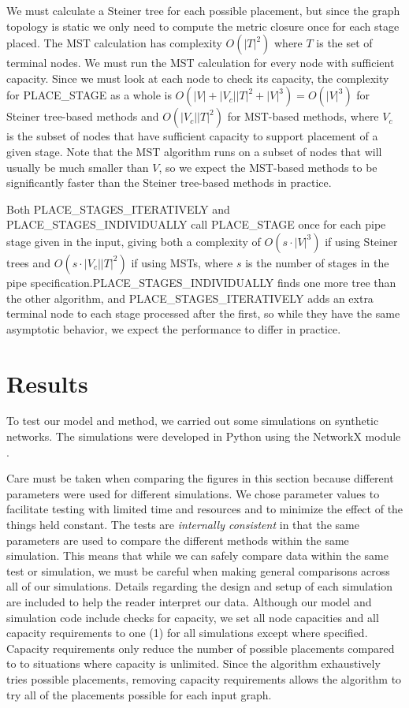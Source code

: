 \documentclass[conference]{IEEEtran}
\begin{document}
	We must calculate a Steiner tree for each possible placement, but since the graph topology is static we only need to compute the metric closure once for each stage placed. The MST calculation has complexity $O(|T|^{2})$ where $T$ is the set of terminal nodes. We must run the MST calculation for every node with sufficient capacity. Since we must look at each node to check its capacity, the complexity for \textsc{PLACE\_STAGE} as a whole is $O(|V| + |V_{c}||T|^{2} + |V|^{3}) = O(|V|^{3})$ for Steiner tree-based methods and $O(|V_{c}||T|^{2})$ for MST-based methods, where $V_{c}$ is the subset of nodes that have sufficient capacity to support placement of a given stage. Note that the MST algorithm runs on a subset of nodes that will usually be much smaller than $V$, so we expect the MST-based methods to be significantly faster than the Steiner tree-based methods in practice.
	
	Both \textsc{PLACE\_STAGES\_ITERATIVELY} and \textsc{PLACE\_STAGES\_INDIVIDUALLY} call \textsc{PLACE\_STAGE} once for each pipe stage given in the input, giving both a complexity of $O(s\cdot |V|^{3})$ if using Steiner trees and $O(s\cdot |V_{c}||T|^{2})$ if using MSTs, where $s$ is the number of stages in the pipe specification.\textsc{PLACE\_STAGES\_INDIVIDUALLY} finds one more tree than the other algorithm, and \textsc{PLACE\_STAGES\_ITERATIVELY} adds an extra terminal node to each stage processed after the first, so while they have the same asymptotic behavior, we expect the performance to differ in practice.
	
	\section{Results}
	To test our model and method, we carried out some simulations on synthetic networks. The simulations were developed in Python using the NetworkX module \cite{Hagberg2008ExploringNS}.
	
	Care must be taken when comparing the figures in this section because different parameters were used for different simulations. We chose parameter values to facilitate testing with limited time and resources and to minimize the effect of the things held constant. The tests are \textit{internally consistent} in that the same parameters are used to compare the different methods within the same simulation. This means that while we can safely compare data within the same test or simulation, we must be careful when making general comparisons across all of our simulations. Details regarding the design and setup of each simulation are included to help the reader interpret our data. Although our model and simulation code include checks for capacity, we set all node capacities and all capacity requirements to one (1) for all simulations except where specified. Capacity requirements only reduce the number of possible placements compared to to situations where capacity is unlimited. Since the algorithm exhaustively tries possible placements, removing capacity requirements allows the algorithm to try all of the placements possible for each input graph.
	
\end{document}
